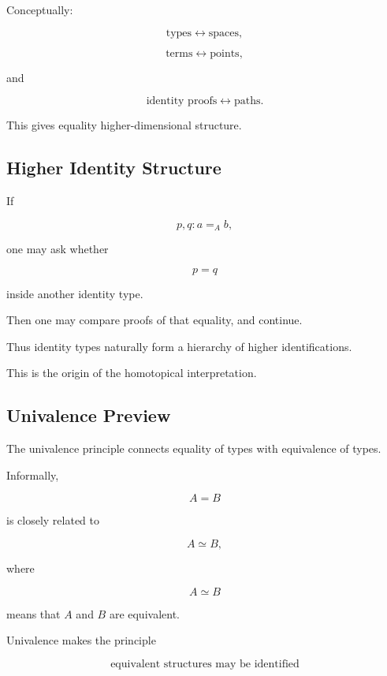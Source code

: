 Conceptually:

\[
\boxed{
\text{types}
\leftrightarrow
\text{spaces},
}
\]

\[
\boxed{
\text{terms}
\leftrightarrow
\text{points},
}
\]

and

\[
\boxed{
\text{identity proofs}
\leftrightarrow
\text{paths}.
}
\]

This gives equality higher-dimensional structure.

\subsection{Higher Identity Structure}
\label{subsec:higher-identity-structure}

If

\[
p,q:a=_A b,
\]

one may ask whether

\[
p=q
\]

inside another identity type.

Then one may compare proofs of that equality, and continue.

Thus identity types naturally form a hierarchy of higher identifications.

This is the origin of the homotopical interpretation.

\subsection{Univalence Preview}
\label{subsec:univalence-preview}

The univalence principle connects equality of types with equivalence of
types.

Informally,

\[
\boxed{
A=B
}
\]

is closely related to

\[
\boxed{
A\simeq B,
}
\]

where

\[
A\simeq B
\]

means that \(A\) and \(B\) are equivalent.

Univalence makes the principle

\[
\boxed{
\text{equivalent structures may be identified}
}
\]

